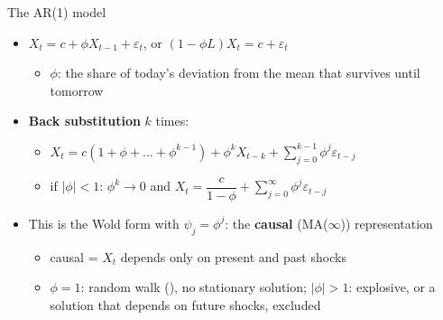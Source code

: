 \begin{frame}{The AR(1) model}
\itemsize{\small}
\begin{itemize}
    \item $X_t = c + \phi X_{t-1} + \varepsilon_t$, or $(1 - \phi L)X_t = c + \varepsilon_t$
    \begin{itemize}
        \item $\phi$: the share of today's deviation from the mean that survives until tomorrow
    \end{itemize}
    \item \textbf{Back substitution} $k$ times:
    \begin{itemize}
        \item $X_t = c(1 + \phi + \dots + \phi^{k-1}) + \phi^kX_{t-k} + \sum_{j=0}^{k-1}\phi^j\varepsilon_{t-j}$
        \item if $|\phi| < 1$: $\phi^k \to 0$ and $X_t = \dfrac{c}{1 - \phi} + \sum_{j=0}^{\infty}\phi^j\varepsilon_{t-j}$
    \end{itemize}
    \item This is the Wold form with $\psi_j = \phi^j$: the \textbf{causal} (MA($\infty$)) representation
    \begin{itemize}
        \item causal = $X_t$ depends only on present and past shocks
        \item $\phi = 1$: random walk (), no stationary solution; $|\phi| > 1$: explosive, or a solution that depends on future shocks, excluded
    \end{itemize}
\end{itemize}
\end{frame}


